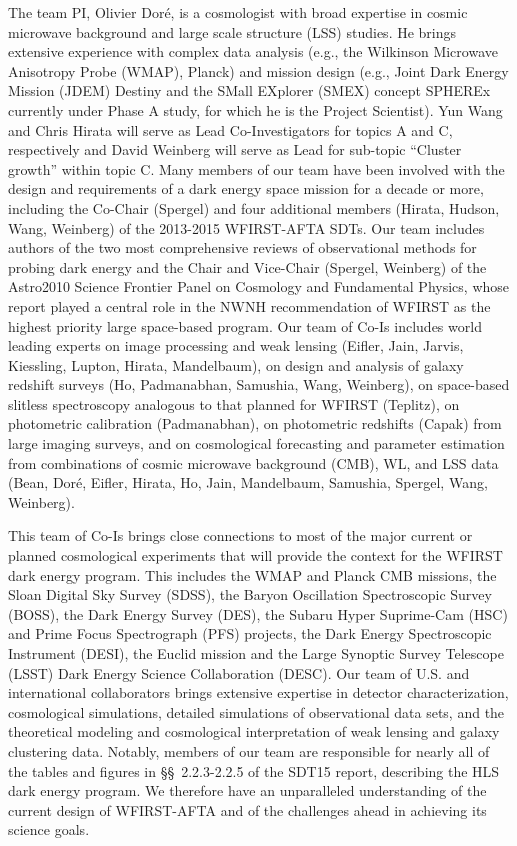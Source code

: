 The team PI, Olivier Dor\'e, is a cosmologist with broad expertise in
cosmic microwave background and large scale structure (LSS) studies. He brings 
extensive experience with complex data analysis (e.g., the Wilkinson
Microwave Anisotropy Probe (WMAP), Planck) and mission design (e.g.,
Joint Dark Energy Mission (JDEM) Destiny and the 
SMall EXplorer (SMEX) concept SPHEREx currently
under Phase A study, for which he is the Project Scientist). Yun Wang
and Chris Hirata will serve as Lead Co-Investigators for topics A and C,
respectively and David Weinberg will serve as Lead for sub-topic
``Cluster growth'' within topic C.  Many members of our team have been involved with the
design and requirements of a dark energy space mission for a decade or
more, including the Co-Chair (Spergel) and four additional members
(Hirata, Hudson, Wang, Weinberg) of the 2013-2015 WFIRST-AFTA SDTs.  Our team
includes authors of the two most comprehensive reviews of observational
methods for probing dark energy \cite{Wang2010, Weinberg2013} and the
Chair and Vice-Chair (Spergel, Weinberg) of the Astro2010 Science
Frontier Panel on Cosmology and Fundamental Physics, whose report played
a central role in the NWNH recommendation of WFIRST as the highest
priority large space-based program.  Our team of Co-Is includes world
leading experts on image processing and weak lensing (Eifler, Jain,
Jarvis, Kiessling, Lupton, Hirata, Mandelbaum), on design and 
analysis of galaxy redshift surveys (Ho, Padmanabhan, Samushia, Wang, Weinberg), 
on
space-based slitless spectroscopy analogous to that planned for WFIRST
(Teplitz), on photometric calibration (Padmanabhan), on photometric
redshifts (Capak) from large imaging surveys, and on cosmological forecasting
and parameter estimation from combinations of cosmic microwave
background (CMB), WL, and LSS data (Bean, Dor\'e, Eifler,
Hirata, Ho, Jain, Mandelbaum, Samushia, Spergel, Wang, Weinberg).

 This team of Co-Is brings close connections to most of the 
major current or planned cosmological experiments that will provide 
the context for the WFIRST dark energy program. This includes the WMAP and Planck CMB missions,
the Sloan Digital Sky Survey (SDSS), the Baryon Oscillation Spectroscopic Survey (BOSS), the Dark Energy Survey (DES),
the Subaru Hyper Suprime-Cam (HSC) and Prime Focus Spectrograph (PFS)
projects, the Dark Energy Spectroscopic Instrument (DESI), the
Euclid mission and the Large Synoptic Survey Telescope (LSST) Dark
Energy Science Collaboration (DESC). Our team of U.S. and
international collaborators brings extensive expertise in detector
characterization, cosmological simulations, detailed simulations of
observational data sets, and the theoretical modeling and cosmological
interpretation of weak lensing and galaxy clustering data. 
Notably, members of our team are responsible for nearly all of the tables
and figures in \S\S\ 2.2.3-2.2.5 of the SDT15 report, describing the
HLS dark energy program.  We therefore have an unparalleled understanding
of the current design of WFIRST-AFTA and of the
challenges ahead in achieving its science goals.

